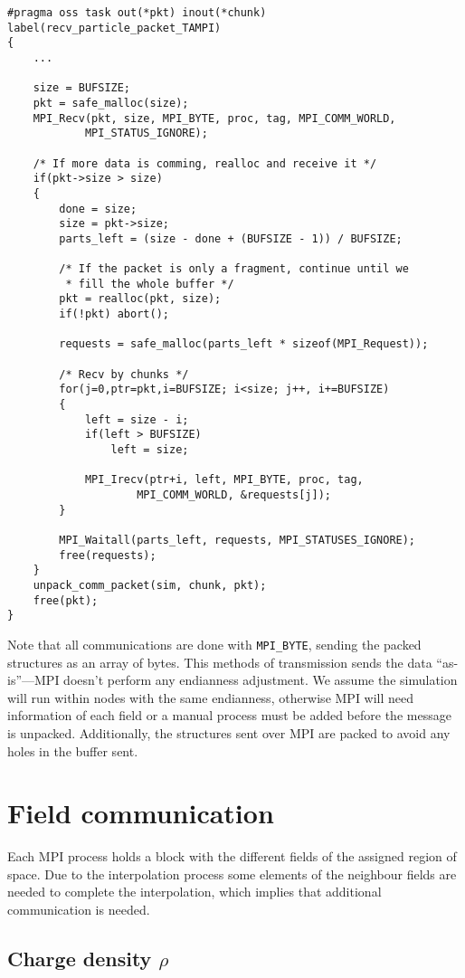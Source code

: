 \begin{lstlisting}[caption={Reception of particles with TAMPI}]
#pragma oss task out(*pkt) inout(*chunk) label(recv_particle_packet_TAMPI)
{
	...

	size = BUFSIZE;
	pkt = safe_malloc(size);
	MPI_Recv(pkt, size, MPI_BYTE, proc, tag, MPI_COMM_WORLD,
			MPI_STATUS_IGNORE);

	/* If more data is comming, realloc and receive it */
	if(pkt->size > size)
	{
		done = size;
		size = pkt->size;
		parts_left = (size - done + (BUFSIZE - 1)) / BUFSIZE;

		/* If the packet is only a fragment, continue until we
		 * fill the whole buffer */
		pkt = realloc(pkt, size);
		if(!pkt) abort();

		requests = safe_malloc(parts_left * sizeof(MPI_Request));

		/* Recv by chunks */
		for(j=0,ptr=pkt,i=BUFSIZE; i<size; j++, i+=BUFSIZE)
		{
			left = size - i;
			if(left > BUFSIZE)
				left = size;

			MPI_Irecv(ptr+i, left, MPI_BYTE, proc, tag,
					MPI_COMM_WORLD, &requests[j]);
		}

		MPI_Waitall(parts_left, requests, MPI_STATUSES_IGNORE);
		free(requests);
	}
	unpack_comm_packet(sim, chunk, pkt);
	free(pkt);
}
\end{lstlisting}

Note that all communications are done with \texttt{MPI\_BYTE}, sending the 
packed structures as an array of bytes. This methods of transmission sends the 
data ``as-is''---MPI doesn't perform any endianness adjustment. We assume the 
simulation will run within nodes with the same endianness, otherwise MPI will 
need information of each field or a manual process must be added before the 
message is unpacked. Additionally, the structures sent over MPI are packed to 
avoid any holes in the buffer sent.

\section{Field communication}

Each MPI process holds a block with the different fields of the assigned region 
of space. Due to the interpolation process some elements of the neighbour fields 
are needed to complete the interpolation, which implies that additional 
communication is needed.

\subsection{Charge density $\rho$}

